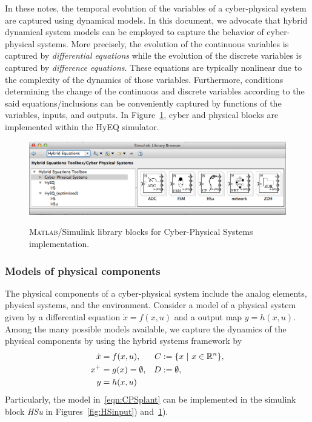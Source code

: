 \documentclass{article}
\newcommand{\matlab}{\textsc{Matlab}}
\begin{document}
In these notes, the temporal evolution of the variables of a cyber-physical system
are captured using dynamical models.
In this document, we advocate that hybrid dynamical system models
can be employed to capture the behavior of cyber-physical systems.
More precisely, the evolution of the continuous variables is captured by 
{\em differential equations}
while the evolution of the discrete variables is captured by
{\em difference equations}.
These equations are typically nonlinear
due to the complexity of the dynamics of those variables.
Furthermore, conditions determining the change of 
the continuous and discrete variables according to the said
equations/inclusions can be conveniently captured by functions of the
variables, inputs, and outputs.  
In Figure~\ref{fig:CPS}, cyber and physical blocks are implemented within the HyEQ simulator.

\begin{figure}[ht]
  \begin{center}
    {\includegraphics[width=1.0\textwidth]{figures/Simulink/SimulinkimplementationCPS_Mac.eps}}
\caption{\matlab{}/Simulink library blocks for Cyber-Physical Systems implementation.}
\label{fig:CPS}
  \end{center}
\end{figure}

\subsubsection{Models of physical components}
\label{sec:PhysicalModels}

The physical components of a cyber-physical system include the analog elements, physical systems, and the environment. 
Consider a model of a physical system given by a differential equation $\dot{x} = f(x,u)$ and a output map $y = h(x,u)$. Among the many possible models available, we capture the dynamics of the physical components
by using the hybrid systems framework by
\begin{subequations}\label{eqn:CPSplant}
\begin{align}
\dot{x} &= f(x,u), 
&C &:= \{ x\ |\ x \in {\mathbb R}^{n}\},\\
x^+ &= g(x) =\emptyset,
&D &:= \emptyset,\\
y &= h(x,u)
\end{align}
\end{subequations}
Particularly, the model in~\eqref{eqn:CPSplant} can be implemented in the simulink block {\em HSu} in Figures~\ref{fig:HSinput}) and~\ref{fig:CPS}).
\end{document}
